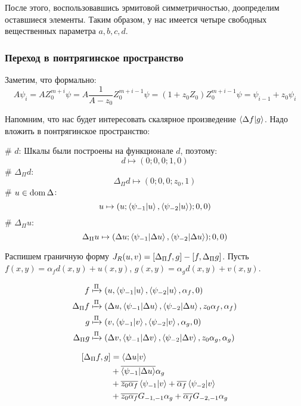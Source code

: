 После этого, воспользовавшись эрмитовой симметричностью, доопределим оставшиеся элементы. Таким образом, у нас имеется четыре свободных вещественных параметра $a, b, c, d$. 

\subsubsection{Переход в понтрягинское пространство}

Заметим, что формально:
\[
A \psi_i = A Z_0^{m + i} \psi = A \frac{1}{A - z_0} Z_0^{m + i - 1} \psi = (1 + z_0 Z_0) Z_0^{m + i - 1} \psi = \psi_{i - 1} + z_0 \psi_i
\]

Напомним, что нас будет интересовать скалярное произведение $\ip{\Delta f}{g}$. Надо вложить в понтрягинское пространство:
\begin{ilist}
# $d$: Шкалы были построены на функционале $d$, поэтому:
\[
d \mapsto (0; 0, 0; 1, 0)
\]
# $\Delta_\Pi d$:
\[
\Delta_\Pi d \mapsto (0; 0, 0; z_0, 1)
\]
# $u \in \operatorname{dom} \Delta$:
\[
u \mapsto (u; \ip{\psi_{-1}}{u}, \ip{\psi_{-2}}{u}); 0, 0)
\]
# $\Delta_\Pi u$:
\[
\Delta_\Pi u \mapsto (\Delta u; \ip{\psi_{-1}}{\Delta u}, \ip{\psi_{-2}}{\Delta u}); 0, 0)
\]
\end{ilist}
 
Распишем граничную форму $J_R(u, v) = [\Delta_\Pi f,g] - [f,\Delta_\Pi g]$. Пусть $f(x, y) = \alpha_f d(x, y) + u(x, y)$, $g(x, y) = \alpha_g d(x, y) + v(x, y)$.

\begin{align*}
f            & \xmapsto[]{\Pi} \Vector{u, \ip{\psi_{-1}}{u}, \ip{\psi_{-2}}{u}, \alpha_f, 0} \\
\Delta_\Pi f & \xmapsto[]{\Pi} \Vector{\Delta u, \ip{\psi_{-1}}{\Delta u}, \ip{\psi_{-2}}{\Delta u}, z_0 \alpha_f, \alpha_f} \\
g            & \xmapsto[]{\Pi} \Vector{v, \ip{\psi_{-1}}{v}, \ip{\psi_{-2}}{v}, \alpha_g, 0} \\
\Delta_\Pi g & \xmapsto[]{\Pi} \Vector{\Delta v, \ip{\psi_{-1}}{\Delta v}, \ip{\psi_{-2}}{\Delta v}, z_0 \alpha_g, \alpha_g}
\end{align*}

\begin{align*}
\iip{\Delta_\Pi f}{g}
&= \ip{\Delta u}{v} \\
&+ \cconj{\ip{\psi_{-1}}{\Delta u}} \alpha_g \\
&+ \cconj{z_0 \alpha_f} \ip{\psi_{-1}}{v} + \cconj{\alpha_f} \ip{\psi_{-2}}{v} \\
&+ \cconj{z_0 \alpha_f} G_{-1, -1} \alpha_g + \cconj{\alpha_f} G_{-2, -1} \alpha_g 
\end{align*}

